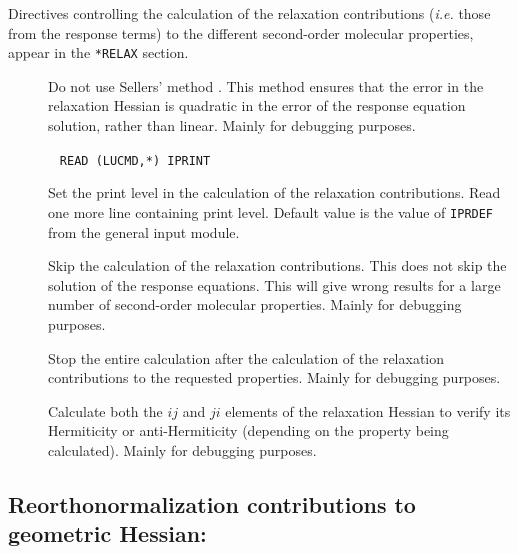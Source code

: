 Directives controlling the calculation of the relaxation
contributions ({\it i.e.\/} those from the response terms) to the different
second-order molecular properties, appear in the \verb|*RELAX| section.
\begin{description}
\item[] Do not use Sellers' method \cite{hsijqc30}. This method
ensures that the error in the relaxation Hessian is quadratic in the
error of the response equation solution, rather than linear. Mainly
for debugging purposes.

\item[]\verb| |\newline
\verb|READ (LUCMD,*) IPRINT|

Set the print level in the calculation of the relaxation
contributions.  Read one more line containing print level.
Default value is the value of \verb|IPRDEF| from the general input
module.

\item[] Skip the calculation of the relaxation
contributions.  This does not skip the solution of the response
equations. This will give wrong results for a large number of
second-order molecular properties. Mainly for debugging purposes.

\item[] Stop the entire calculation after the
calculation of the relaxation contributions to the requested
properties. Mainly for debugging purposes.

\item[] Calculate both the $ij$ and $ji$ elements of
the relaxation Hessian to verify its Hermiticity or anti-Hermiticity
(depending on the property being calculated). Mainly for debugging
purposes.
\end{description}

\subsection{Reorthonormalization contributions to geometric Hessian: }

